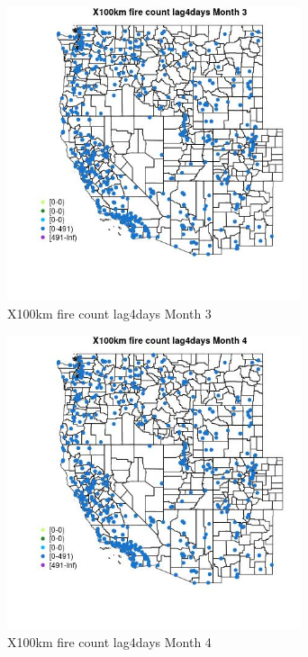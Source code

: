 \begin{figure} 
\centering  
\includegraphics[width=0.77\textwidth]{Code_Outputs/Report_ML_input_PM25_Step4_part_e_de_duplicated_aves_compiled_2019-05-14wNAs_MapObsMo3X100km_fire_count_lag4days.jpg} 
\caption{\label{fig:Report_ML_input_PM25_Step4_part_e_de_duplicated_aves_compiled_2019-05-14wNAsMapObsMo3X100km_fire_count_lag4days}X100km fire count lag4days Month 3} 
\end{figure} 
 

\begin{figure} 
\centering  
\includegraphics[width=0.77\textwidth]{Code_Outputs/Report_ML_input_PM25_Step4_part_e_de_duplicated_aves_compiled_2019-05-14wNAs_MapObsMo4X100km_fire_count_lag4days.jpg} 
\caption{\label{fig:Report_ML_input_PM25_Step4_part_e_de_duplicated_aves_compiled_2019-05-14wNAsMapObsMo4X100km_fire_count_lag4days}X100km fire count lag4days Month 4} 
\end{figure} 
 

